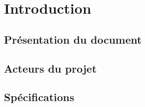 \chapter{Introduction}
\label{ch:intro}

\section{Présentation du document}
\section{Acteurs du projet}
\section{Spécifications}